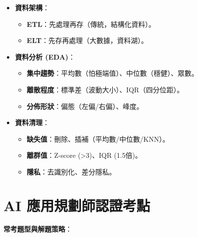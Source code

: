 \documentclass[
  letterpaper,
  DIV=11,
  numbers=noendperiod]{scrreprt}
\providecommand{\tightlist}{%
  \setlength{\itemsep}{0pt}\setlength{\parskip}{0pt}}
\begin{document}
\begin{itemize}
\tightlist
\item
  \textbf{資料架構}：

  \begin{itemize}
  \tightlist
  \item
    \textbf{ETL}：先處理再存（傳統，結構化資料）。
  \item
    \textbf{ELT}：先存再處理（大數據，資料湖）。
  \end{itemize}
\item
  \textbf{資料分析 (EDA)}：

  \begin{itemize}
  \tightlist
  \item
    \textbf{集中趨勢}：平均數（怕極端值）、中位數（穩健）、眾數。
  \item
    \textbf{離散程度}：標準差（波動大小）、IQR（四分位距）。
  \item
    \textbf{分佈形狀}：偏態（左偏/右偏）、峰度。
  \end{itemize}
\item
  \textbf{資料清理}：

  \begin{itemize}
  \tightlist
  \item
    \textbf{缺失值}：刪除、插補（平均數/中位數/KNN）。
  \item
    \textbf{離群值}：Z-score (\textgreater3)、IQR (1.5倍)。
  \item
    \textbf{隱私}：去識別化、差分隱私。
  \end{itemize}
\end{itemize}

\section{AI
應用規劃師認證考點}\label{ai-ux61c9ux7528ux898fux5283ux5e2bux8a8dux8b49ux8003ux9ede-2}

\textbf{常考題型與解題策略}：
\end{document}
